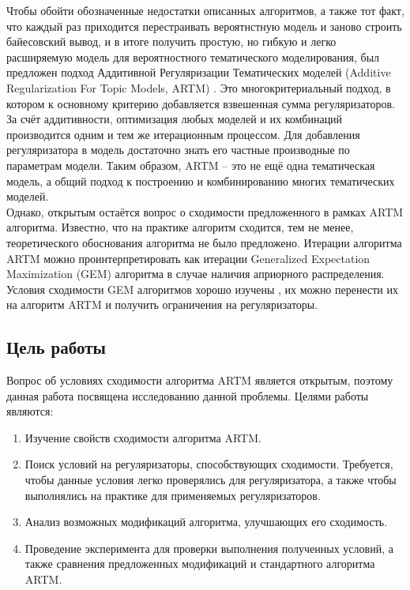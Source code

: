 \documentclass[12pt]{article}
\begin{document}
Чтобы обойти обозначенные недостатки описанных алгоритмов, а также тот факт, что каждый раз приходится перестраивать вероятнстную модель и заново строить байесовский вывод, и в итоге получить простую, но гибкую и легко расширяемую модель для вероятностного тематического моделирования, был предложен подход Аддитивной Регуляризации Тематических моделей (Additive Regularization For Topic Models, ARTM) \cite{artmdef1, artmdef2, artmdef3}. Это многокритериальный подход, в котором к основному критерию добавляется взвешенная сумма регуляризаторов.  За счёт аддитивности, оптимизация любых моделей и их комбинаций производится одним и тем же итерационным процессом. Для добавления регуляризатора в модель достаточно знать его частные производные по параметрам модели. Таким образом, ARTM --  это не ещё одна тематическая модель, а общий подход к построению и комбинированию многих тематических моделей. \\
Однако, открытым остаётся вопрос о сходимости предложенного в рамках ARTM алгоритма. Известно, что на практике алгоритм сходится, тем не менее, теоретического обоснования алгоритма не было предложено. Итерации алгоритма ARTM можно проинтерпретировать как итерации Generalized Expectation Maximization (GEM) алгоритма \cite{basegem} в случае наличия априорного распределения. Условия сходимости GEM алгоритмов хорошо изучены \cite{wuem}, их можно перенести их на алгоритм ARTM и получить ограничения на регуляризаторы.

	\subsection{Цель работы}
	Вопрос об условиях сходимости алгоритма ARTM является открытым, поэтому данная работа посвящена исследованию данной проблемы. Целями работы являются:
\begin{enumerate}
\item Изучение свойств сходимости алгоритма ARTM. 
\item Поиск условий на регуляризаторы, способствующих сходимости. Требуется, чтобы данные условия легко проверялись для регуляризатора, а также чтобы выполнялись на практике для применяемых регуляризаторов.
\item Анализ возможных модификаций алгоритма, улучшающих его сходимость.
\item Проведение эксперимента для проверки выполнения полученных условий, а также сравнения предложенных модификаций и стандартного алгоритма ARTM.
\end{enumerate}
\end{document}
